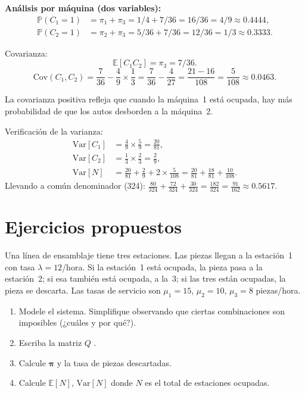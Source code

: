 \documentclass[11pt,a4paper]{article}
\theoremstyle{definition}
\theoremstyle{remark}
\newcommand{\E}{\mathbb{E}}
\newcommand{\Var}{\mathrm{Var}}
\newcommand{\Cov}{\mathrm{Cov}}
\newcommand{\Prob}{\mathbb{P}}
\begin{document}
\begin{ejemplo}
\textbf{Análisis por máquina (dos variables):}
\begin{align*}
  \Prob(C_1=1) &= \pi_1+\pi_3 = 1/4+7/36 = 16/36 = 4/9 \approx 0.4444, \\
  \Prob(C_2=1) &= \pi_2+\pi_3 = 5/36+7/36 = 12/36 = 1/3 \approx 0.3333.
\end{align*}

Covarianza:
\[
  \E[C_1 C_2] = \pi_3 = 7/36.
\]
\[
  \Cov(C_1,C_2) = \frac{7}{36}-\frac{4}{9}\times\frac{1}{3}
  = \frac{7}{36}-\frac{4}{27} = \frac{21-16}{108} = \frac{5}{108}
  \approx 0.0463.
\]

La covarianza positiva refleja que cuando la máquina~1 está ocupada, hay
más probabilidad de que los autos desborden a la máquina~2.

Verificación de la varianza:
\begin{align*}
  \Var[C_1] &= \frac{4}{9}\times\frac{5}{9} = \frac{20}{81}, \\
  \Var[C_2] &= \frac{1}{3}\times\frac{2}{3} = \frac{2}{9}, \\
  \Var[N] &= \frac{20}{81}+\frac{2}{9}+2\times\frac{5}{108}
  = \frac{20}{81}+\frac{18}{81}+\frac{10}{108}.
\end{align*}
Llevando a común denominador (324):
$\frac{80}{324}+\frac{72}{324}+\frac{30}{324} = \frac{182}{324}
= \frac{91}{162} \approx 0.5617$. \checkmark
\end{ejemplo}

\section{Ejercicios propuestos}

\begin{ejercicio}
Una línea de ensamblaje tiene tres estaciones.  Las piezas llegan a la
estación~1 con tasa $\lambda=12$/hora.  Si la estación~1 está ocupada,
la pieza pasa a la estación~2; si esa también está ocupada, a la~3; si
las tres están ocupadas, la pieza se descarta.  Las tasas de servicio
son $\mu_1=15$, $\mu_2=10$, $\mu_3=8$ piezas/hora.

\begin{enumerate}[label=(\alph*)]
  \item Modele el sistema.
        Simplifique observando que ciertas combinaciones son imposibles
        (¿cuáles y por qué?).
  \item Escriba la matriz $Q$ .
  \item Calcule $\boldsymbol{\pi}$ y la tasa de piezas descartadas.
  \item Calcule $\E[N]$, $\Var[N]$ donde $N$ es el total de estaciones
        ocupadas.
\end{enumerate}
\end{ejercicio}
\end{document}
